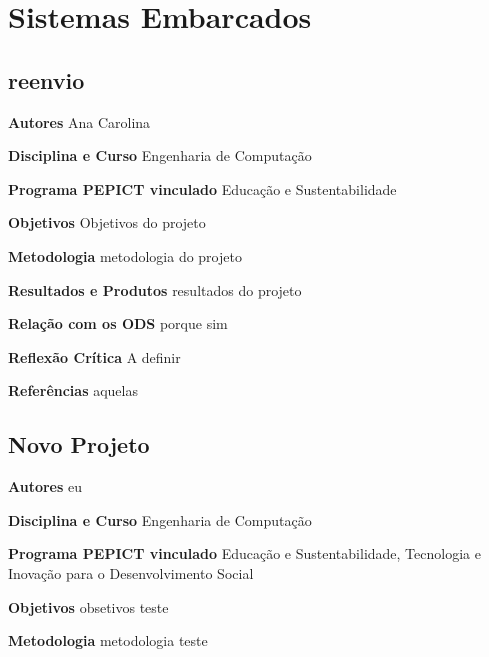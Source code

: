 \documentclass[12pt,openright,oneside,a4paper]{report}
\begin{document}
\vspace{0.7cm}
\chapter{Sistemas Embarcados}

\section{reenvio}
\noindent
\textbf{Autores}
Ana Carolina

\vspace{0.7cm}
\noindent
\textbf{Disciplina e Curso}
Engenharia de Computação

\vspace{0.7cm}
\noindent
\textbf{Programa PEPICT vinculado}
Educação e Sustentabilidade

\vspace{0.7cm}
\noindent
\textbf{Objetivos}
Objetivos do projeto

\vspace{0.7cm}
\noindent
\textbf{Metodologia}
metodologia do projeto

\vspace{0.7cm}
\noindent
\textbf{Resultados e Produtos}
resultados do projeto

\vspace{0.7cm}
\noindent
\textbf{Relação com os ODS}
porque sim

\vspace{0.7cm}
\noindent
\textbf{Reflexão Crítica}
A definir

\vspace{0.7cm}
\noindent
\textbf{Referências}
aquelas

\vspace{0.7cm}
\section{Novo Projeto}
\noindent
\textbf{Autores}
eu

\vspace{0.7cm}
\noindent
\textbf{Disciplina e Curso}
Engenharia de Computação

\vspace{0.7cm}
\noindent
\textbf{Programa PEPICT vinculado}
Educação e Sustentabilidade, Tecnologia e Inovação para o Desenvolvimento Social

\vspace{0.7cm}
\noindent
\textbf{Objetivos}
obsetivos teste

\vspace{0.7cm}
\noindent
\textbf{Metodologia}
metodologia teste
\end{document}

